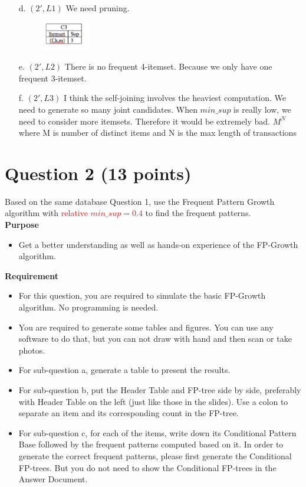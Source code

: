 \begin{itemize}
\item[d.] $(2', L1)$ We need pruning. 

\begin{figure}[H]
\includegraphics[width=0.2\textwidth]{Figures/C3.png}
\centering
\end{figure}


\item[e.] $(2', L2)$ There is no frequent 4-itemset. Because we only have one frequent 3-itemset.

\item[f.] $(2', L3)$  I think the self-joining involves the heaviest computation. We need to generate so many joint candidates. When $min\_sup$ is really low, we need to consider more itemsets. Therefore it would be extremely bad. $M^N$ where M is number of distinct items and N is the max length of transactions
\end{itemize}


\section*{Question 2 (13 points)}
Based on the same database Question 1, use the Frequent Pattern Growth algorithm with \textcolor{red}{relative $min\_sup=0.4$} to find the frequent patterns.\\

\textbf{Purpose}
\begin{itemize}
\item Get a better understanding as well as hands-on experience of the FP-Growth algorithm.
\end{itemize}

\textbf{Requirement}
\begin{itemize}
\item For this question, you are required to simulate the basic FP-Growth algorithm. No programming is needed.
\item You are required to generate some tables and figures. You can use any software to do that, but you can not draw with hand and then scan or take photos. 
\item For sub-question a, generate a table to present the results.
\item For sub-question b, put the Header Table and FP-tree side by side, preferably with Header Table on the left (just like those in the slides). Use a colon to separate an item and its corresponding count in the FP-tree.
\item For sub-question c, for each of the items, write down its Conditional Pattern Base followed by the frequent patterns computed based on it. In order to generate the correct frequent patterns, please first generate the Conditional FP-trees. But you do not need to show the Conditional FP-trees in the Answer Document.
\end{itemize}

